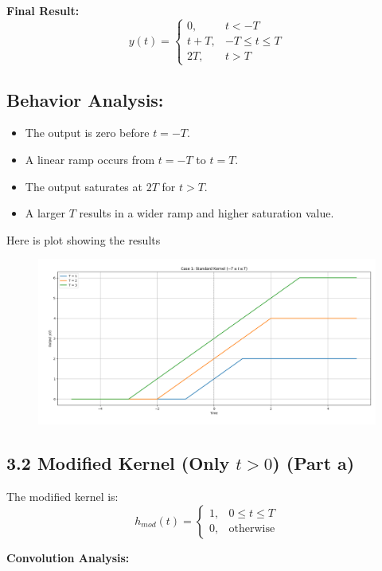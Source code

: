\documentclass[12pt,a4paper,titlepage]{article}
\begin{document}
\textbf{Final Result:}
\begin{equation}
y(t) = 
\begin{cases} 
0, & t < -T \\
t + T, & -T \leq t \leq T \\
2T, & t > T 
\end{cases}
\end{equation}

\subsection*{Behavior Analysis:}
\begin{itemize}
    \item The output is zero before \( t = -T \).
    \item A linear ramp occurs from \( t = -T \) to \( t = T \).
    \item The output saturates at \( 2T \) for \( t > T \).
    \item A larger \( T \) results in a wider ramp and higher saturation value.
\end{itemize}
Here is plot showing the results
\begin{figure}[H]
    \centering
    \includegraphics[width=0.8\linewidth]{plotsstep/case1step.png}
    \label{fig:enter-label}
\end{figure}
\subsection*{3.2 Modified Kernel (Only \( t > 0 \)) (Part a)}

The modified kernel is:
\begin{equation}
h_{mod}(t) = 
\begin{cases} 
1, & 0 \leq t \leq T \\
0, & \text{otherwise}
\end{cases}
\end{equation}

\textbf{Convolution Analysis:}
\end{document}
